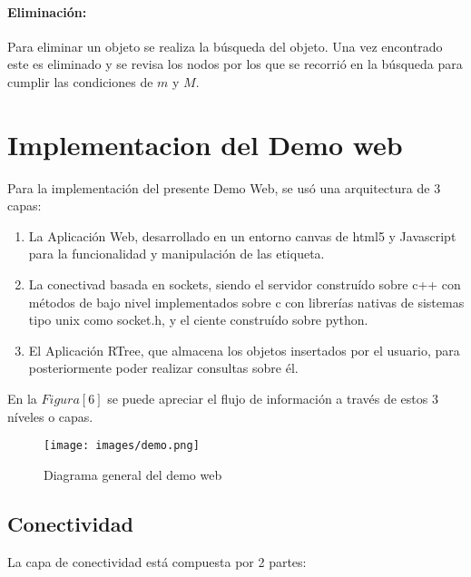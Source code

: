 \documentclass[12pt]{article}
\begin{document}
\paragraph{Eliminación:} Para eliminar un objeto se realiza la búsqueda del objeto. Una vez encontrado este es eliminado y se revisa los nodos por los que se recorrió en la búsqueda para cumplir las condiciones de $m$ y $M$.
\section*{Implementacion del Demo web} %

Para la implementación del presente Demo Web, se usó una arquitectura de 3 capas:

\begin{enumerate}
\item La Aplicación Web, desarrollado en un entorno canvas de html5 y Javascript para la funcionalidad y manipulación de las etiqueta.

\item La conectivad basada en sockets, siendo el servidor construído sobre c++ con métodos de bajo nivel implementados sobre c con librerías nativas de sistemas tipo unix como socket.h, y el ciente construído sobre python.

\item El Aplicación RTree, que almacena los objetos insertados por el usuario, para posteriormente poder realizar consultas sobre él.
\end{enumerate}

En la $Figura [6]$ se puede apreciar el flujo de información a través de estos 3 níveles o capas.

\begin{figure}
\centering
\texttt{[image: images/demo.png]}
\centering
\caption{Diagrama general del demo web}
\end{figure}

\subsection*{Conectividad }

La capa de conectividad está compuesta por 2 partes:
\end{document}
